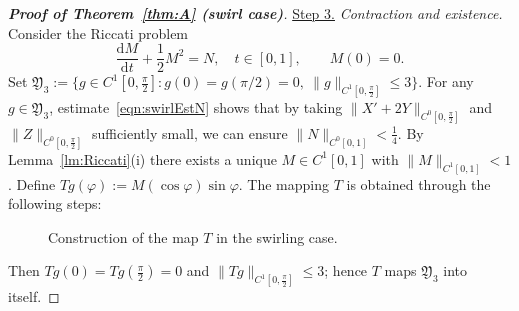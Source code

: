 \documentclass{amsart}
\newcommand{\rmd}{\mathrm{d}}
\begin{document}
\begin{proof}[\textbf{Proof of Theorem~\ref{thm:A} (swirl case)}]
\noindent\underline{Step 3.} \emph{Contraction and existence.}
Consider the Riccati problem
\[
\frac{\rmd M}{\rmd t} + \frac12 M^2 = N, \quad t \in [0,1],\qquad M(0)=0.
\]
Set $\mathfrak{Y}_3 := \{ g\in C^1[0,\frac{\pi}{2}] : g(0)=g(\pi/2)=0,\ \|g\|_{C^1[0,\frac{\pi}{2}]}\le 3\}$.
For any $g\in\mathfrak{Y}_{3}$, estimate~\eqref{eqn:swirlEstN} shows that by taking $\|X'+2Y\|_{C^{0}[0,\frac{\pi}{2}]}$ and $\|Z\|_{C^{0}[0,\frac{\pi}{2}]}$ sufficiently small, we can ensure $\|N\|_{C^{0}[0,1]}<\frac14$.
By Lemma~\ref{lm:Riccati}(i) there exists a unique $M\in C^{1}[0,1]$ with $\|M\|_{C^{1}[0,1]}<1$.
Define $Tg(\varphi) := M(\cos\varphi)\sin\varphi$.
The mapping $T$ is obtained through the following steps:
\begin{figure}[htbp]
\centering
{}
\caption{Construction of the map $T$ in the swirling case.}
\end{figure}

\noindent
Then $Tg(0)=Tg(\frac\pi2)=0$ and $\|Tg\|_{C^{1}[0,\frac{\pi}{2}]}\le 3$; hence $T$ maps $\mathfrak{Y}_{3}$ into itself.



\end{proof}
\end{document}
